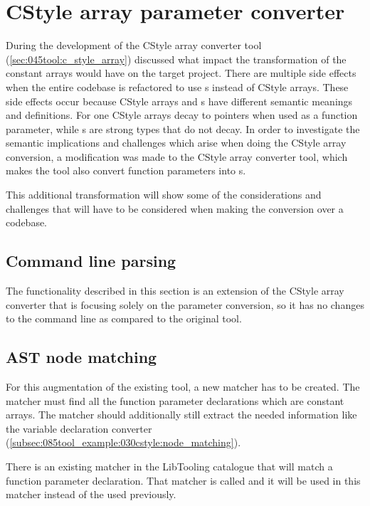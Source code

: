 
\section{CStyle array parameter converter} \label{sec:080:035:cstyleArrayParm}

During the development of the CStyle array converter tool (\cref{sec:045tool:c_style_array}) discussed what impact the transformation of the constant arrays would have on the target project. There are multiple side effects when the entire codebase is refactored to use s instead of CStyle arrays. These side effects occur because CStyle arrays and s have different semantic meanings and definitions. For one CStyle arrays decay to pointers when used as a function parameter, while s are strong types that do not decay. In order to investigate the semantic implications and challenges which arise when doing the CStyle array conversion, a modification was made to the CStyle array converter tool, which makes the tool also convert function parameters into s.

This additional transformation will show some of the considerations and challenges that will have to be considered when making the conversion over a codebase.

\subsection{Command line parsing}

The functionality described in this section is an extension of the CStyle array converter that is focusing solely on the parameter conversion, so it has no changes to the command line as compared to the original tool.

\subsection{AST node matching}

For this augmentation of the existing tool, a new matcher has to be created. The matcher must find all the function parameter declarations which are constant arrays. The matcher should additionally still extract the needed information like the variable declaration converter (\cref{subsec:085tool_example:030cstyle:node_matching}).

There is an existing matcher in the LibTooling catalogue that will match a function parameter declaration. That matcher is called  and it will be used in this matcher instead of the  used previously.

